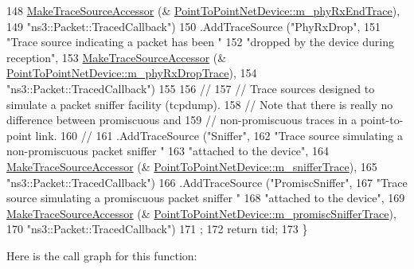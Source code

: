 \begin{DoxyCode}
148                      \hyperlink{group__tracing_gab21a770b9855af4e8f69f7531ea4a6b0}{MakeTraceSourceAccessor} (&
      \hyperlink{classns3_1_1PointToPointNetDevice_a087003567f5836b7dafda69423dda203}{PointToPointNetDevice::m\_phyRxEndTrace}),
149                      \textcolor{stringliteral}{"ns3::Packet::TracedCallback"})
150     .AddTraceSource (\textcolor{stringliteral}{"PhyRxDrop"}, 
151                      \textcolor{stringliteral}{"Trace source indicating a packet has been "}
152                      \textcolor{stringliteral}{"dropped by the device during reception"},
153                      \hyperlink{group__tracing_gab21a770b9855af4e8f69f7531ea4a6b0}{MakeTraceSourceAccessor} (&
      \hyperlink{classns3_1_1PointToPointNetDevice_a8c980fe1c80f3e7c084e489e0176aeda}{PointToPointNetDevice::m\_phyRxDropTrace}),
154                      \textcolor{stringliteral}{"ns3::Packet::TracedCallback"})
155 
156     \textcolor{comment}{//}
157     \textcolor{comment}{// Trace sources designed to simulate a packet sniffer facility (tcpdump).}
158     \textcolor{comment}{// Note that there is really no difference between promiscuous and }
159     \textcolor{comment}{// non-promiscuous traces in a point-to-point link.}
160     \textcolor{comment}{//}
161     .AddTraceSource (\textcolor{stringliteral}{"Sniffer"}, 
162                     \textcolor{stringliteral}{"Trace source simulating a non-promiscuous packet sniffer "}
163                      \textcolor{stringliteral}{"attached to the device"},
164                      \hyperlink{group__tracing_gab21a770b9855af4e8f69f7531ea4a6b0}{MakeTraceSourceAccessor} (&
      \hyperlink{classns3_1_1PointToPointNetDevice_ae62def3355a42b37b41f7d59dc81bb0e}{PointToPointNetDevice::m\_snifferTrace}),
165                      \textcolor{stringliteral}{"ns3::Packet::TracedCallback"})
166     .AddTraceSource (\textcolor{stringliteral}{"PromiscSniffer"}, 
167                      \textcolor{stringliteral}{"Trace source simulating a promiscuous packet sniffer "}
168                      \textcolor{stringliteral}{"attached to the device"},
169                      \hyperlink{group__tracing_gab21a770b9855af4e8f69f7531ea4a6b0}{MakeTraceSourceAccessor} (&
      \hyperlink{classns3_1_1PointToPointNetDevice_ad1f77c2c8a3e70210dfd89f0d4b670de}{PointToPointNetDevice::m\_promiscSnifferTrace}),
170                      \textcolor{stringliteral}{"ns3::Packet::TracedCallback"})
171   ;
172   \textcolor{keywordflow}{return} tid;
173 \}
\end{DoxyCode}


Here is the call graph for this function\+:


